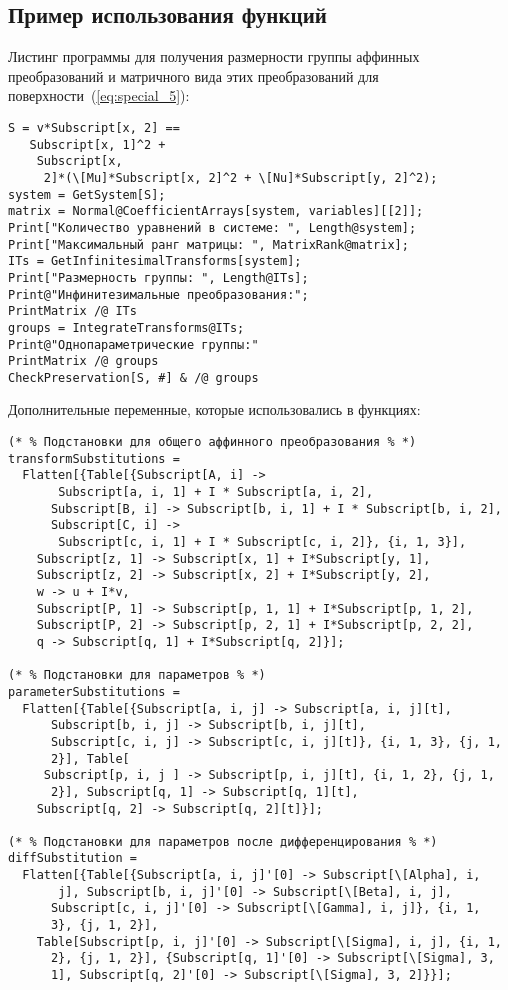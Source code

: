 \documentclass[../main.tex]{subfiles}
\begin{document}
\subsection{Пример использования функций}
Листинг программы для получения размерности группы аффинных преобразований и матричного вида этих преобразований для поверхности~(\ref{eq:special_5}):
\begin{lstlisting}
S = v*Subscript[x, 2] ==
   Subscript[x, 1]^2 +
    Subscript[x,
     2]*(\[Mu]*Subscript[x, 2]^2 + \[Nu]*Subscript[y, 2]^2);
system = GetSystem[S];
matrix = Normal@CoefficientArrays[system, variables][[2]];
Print["Количество уравнений в системе: ", Length@system];
Print["Максимальный ранг матрицы: ", MatrixRank@matrix];
ITs = GetInfinitesimalTransforms[system];
Print["Размерность группы: ", Length@ITs];
Print@"Инфинитезимальные преобразования:";
PrintMatrix /@ ITs
groups = IntegrateTransforms@ITs;
Print@"Однопараметрические группы:"
PrintMatrix /@ groups
CheckPreservation[S, #] & /@ groups
\end{lstlisting}
Дополнительные переменные, которые использовались в функциях:
\begin{lstlisting}
(* % Подстановки для общего аффинного преобразования % *)
transformSubstitutions =
  Flatten[{Table[{Subscript[A, i] ->
       Subscript[a, i, 1] + I * Subscript[a, i, 2],
      Subscript[B, i] -> Subscript[b, i, 1] + I * Subscript[b, i, 2],
      Subscript[C, i] ->
       Subscript[c, i, 1] + I * Subscript[c, i, 2]}, {i, 1, 3}],
    Subscript[z, 1] -> Subscript[x, 1] + I*Subscript[y, 1],
    Subscript[z, 2] -> Subscript[x, 2] + I*Subscript[y, 2],
    w -> u + I*v,
    Subscript[P, 1] -> Subscript[p, 1, 1] + I*Subscript[p, 1, 2],
    Subscript[P, 2] -> Subscript[p, 2, 1] + I*Subscript[p, 2, 2],
    q -> Subscript[q, 1] + I*Subscript[q, 2]}];

(* % Подстановки для параметров % *)
parameterSubstitutions =
  Flatten[{Table[{Subscript[a, i, j] -> Subscript[a, i, j][t],
      Subscript[b, i, j] -> Subscript[b, i, j][t],
      Subscript[c, i, j] -> Subscript[c, i, j][t]}, {i, 1, 3}, {j, 1,
      2}], Table[
     Subscript[p, i, j ] -> Subscript[p, i, j][t], {i, 1, 2}, {j, 1,
      2}], Subscript[q, 1] -> Subscript[q, 1][t],
    Subscript[q, 2] -> Subscript[q, 2][t]}];

(* % Подстановки для параметров после дифференцирования % *)
diffSubstitution =
  Flatten[{Table[{Subscript[a, i, j]'[0] -> Subscript[\[Alpha], i,
       j], Subscript[b, i, j]'[0] -> Subscript[\[Beta], i, j],
      Subscript[c, i, j]'[0] -> Subscript[\[Gamma], i, j]}, {i, 1,
      3}, {j, 1, 2}],
    Table[Subscript[p, i, j]'[0] -> Subscript[\[Sigma], i, j], {i, 1,
      2}, {j, 1, 2}], {Subscript[q, 1]'[0] -> Subscript[\[Sigma], 3,
      1], Subscript[q, 2]'[0] -> Subscript[\[Sigma], 3, 2]}}];
\end{lstlisting}
\end{document}
